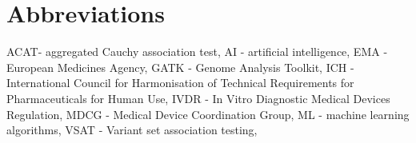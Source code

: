 \section{Abbreviations} 

ACAT-  aggregated Cauchy association test,
AI - artificial intelligence,
EMA -  European Medicines Agency,
GATK - Genome Analysis Toolkit,
ICH - International Council for Harmonisation of Technical Requirements for Pharmaceuticals for Human Use,
IVDR - In Vitro Diagnostic Medical Devices Regulation,
MDCG - Medical Device Coordination Group,
ML - machine learning algorithms,
VSAT - Variant set association testing,

